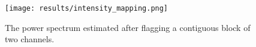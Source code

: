 \begin{figure}[th]
	\centering
	\texttt{[image: results/intensity\_mapping.png]}
	\caption[Resolution and redshift of intensity mapping experiments]{The power spectrum estimated after flagging a contiguous block of two channels.}
	\label{fig:intensity_mapping}
\end{figure}

